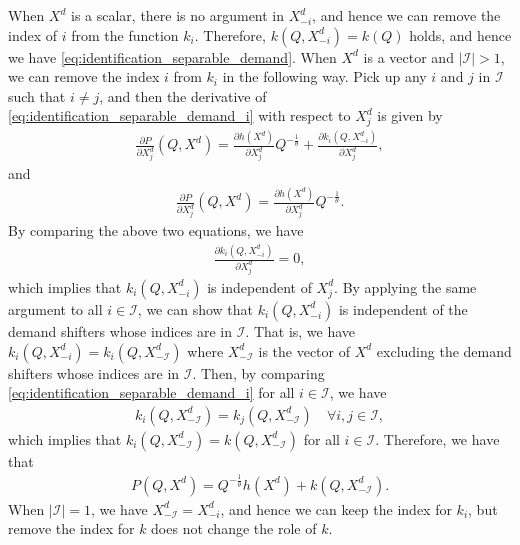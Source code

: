 \documentclass[11pt, a4paper]{article}
\theoremstyle{remark}
\begin{document}
When $X^{d}$ is a scalar, there is no argument in $X^{d}_{-i}$, and hence we can remove the index of $i$ from the function $k_i$.
Therefore, $k(Q, X^{d}_{-i}) = k(Q)$ holds, and hence we have \eqref{eq:identification_separable_demand}.
When $X^{d}$ is a vector and $|\mathcal{I}| > 1$, we can remove the index $i$ from $k_i$ in the following way.
Pick up any $i$ and $j$ in $\mathcal{I}$ such that $i \ne j$, and then the derivative of \eqref{eq:identification_separable_demand_i} with respect to $X^{d}_j$ is given by
\begin{align}
    \frac{\partial P}{\partial X^{d}_j}(Q, X^{d}) = \frac{\partial h(X^{d})}{\partial X^{d}_j} Q^{-\frac{1}{\theta}} + \frac{\partial k_i(Q, X^{d}_{-i})}{\partial X^{d}_j},
\end{align}
and
\begin{align}
    \frac{\partial P}{\partial X^{d}_j}(Q, X^{d}) = \frac{\partial h(X^{d})}{\partial X^{d}_j} Q^{-\frac{1}{\theta}}.
\end{align}
By comparing the above two equations, we have
\begin{align}
    \frac{\partial k_i(Q, X^{d}_{-i})}{\partial X^{d}_j} = 0,
\end{align} 
which implies that $k_i(Q, X^{d}_{-i})$ is independent of $X^{d}_j$.
By applying the same argument to all $i \in \mathcal{I}$, we can show that $k_i(Q, X^{d}_{-i})$ is independent of the demand shifters whose indices are in $\mathcal{I}$.
That is, we have $k_i(Q, X^{d}_{-i}) = k_i(Q, X^{d}_{-\mathcal{I}})$ where $X^{d}_{-\mathcal{I}}$ is the vector of $X^{d}$ excluding the demand shifters whose indices are in $\mathcal{I}$.
Then, by comparing \eqref{eq:identification_separable_demand_i} for all $i \in \mathcal{I}$, we have
\begin{align}
    k_i(Q, X^{d}_{-\mathcal{I}}) = k_j(Q, X^{d}_{-\mathcal{I}}) \quad \forall i,j \in \mathcal{I},
\end{align}
which implies that $k_i(Q, X^{d}_{-\mathcal{I}}) = k(Q, X^{d}_{-\mathcal{I}})$ for all $i \in \mathcal{I}$.
Therefore, we have that
\begin{align}
    P(Q, X^{d}) = Q^{-\frac{1}{\theta}}h(X^{d}) + k(Q, X^{d}_{-\mathcal{I}}).
\end{align}
When $|\mathcal{I}| = 1$, we have $X^{d}_{-\mathcal{I}} = X^{d}_{-i}$, and hence we can keep the index for $k_i$, but remove the index for $k$ does not change the role of $k$.

\end{document}
